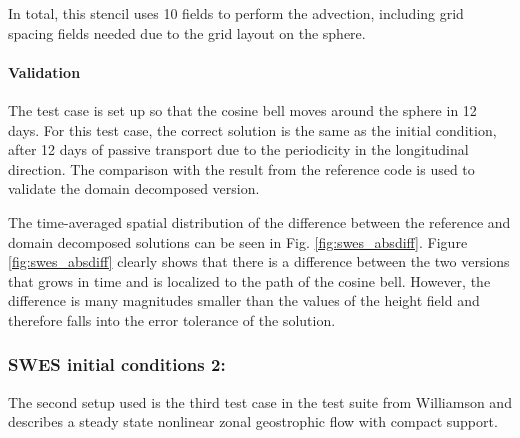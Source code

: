 In total, this stencil uses 10 fields to perform the advection, including grid spacing fields needed due to the grid layout on the sphere.

\paragraph{Validation}
The test case is set up so that the cosine bell moves around the sphere in 12 days.
For this test case, the correct solution is the same as the initial condition, after 12 days of passive transport due to the periodicity in the longitudinal direction.
The comparison with the result from the reference code is used to validate the domain decomposed version.

The time-averaged spatial distribution of the difference between the reference and domain decomposed solutions can be seen in Fig. \ref{fig:swes_absdiff}.
Figure \ref{fig:swes_absdiff} clearly shows that there is a difference between the two versions that grows in time and is localized to the path of the cosine bell.
However, the difference is many magnitudes smaller than the values of the height field and therefore falls into the error tolerance of the solution.

\subsubsection{SWES initial conditions 2:}
The second setup used is the third test case in the test suite from Williamson and describes a steady state nonlinear zonal geostrophic flow with compact support.

